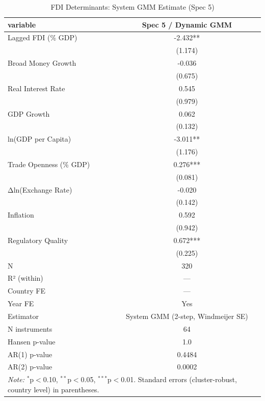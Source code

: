 \begin{table}[htbp]
\centering
\caption{FDI Determinants: System GMM Estimate (Spec 5)}
\label{tab:regression_spec5_gmm}
\begin{tabular}{lc}
\hline\hline
variable & Spec 5 / Dynamic GMM \\
\hline
Lagged FDI (\% GDP) & -2.432** \\
 & (1.174) \\
Broad Money Growth & -0.036 \\
 & (0.675) \\
Real Interest Rate & 0.545 \\
 & (0.979) \\
GDP Growth & 0.062 \\
 & (0.132) \\
ln(GDP per Capita) & -3.011** \\
 & (1.176) \\
Trade Openness (\% GDP) & 0.276*** \\
 & (0.081) \\
Δln(Exchange Rate) & -0.020 \\
 & (0.142) \\
Inflation & 0.592 \\
 & (0.942) \\
Regulatory Quality & 0.672*** \\
 & (0.225) \\
\hline
N & 320 \\
R² (within) & — \\
Country FE & — \\
Year FE & Yes \\
Estimator & System GMM (2-step, Windmeijer SE) \\
N instruments & 64 \\
Hansen p-value & 1.0 \\
AR(1) p-value & 0.4484 \\
AR(2) p-value & 0.0002 \\
\hline\hline
\multicolumn{2}{l}{\textit{Note:} $^{*}$p$<$0.10, $^{**}$p$<$0.05, $^{***}$p$<$0.01. Standard errors (cluster-robust, country level) in parentheses.}
\end{tabular}
\end{table}